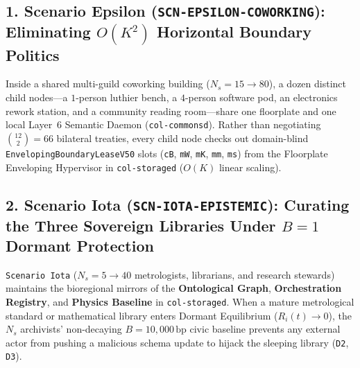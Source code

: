 \subsection{1. Scenario Epsilon (\texttt{SCN-EPSILON-COWORKING}): Eliminating $O(K^2)$ Horizontal Boundary Politics}
Inside a shared multi-guild coworking building ($N_s = 15 \to 80$), a dozen distinct child nodes---a $1$-person luthier bench, a $4$-person software pod, an electronics rework station, and a community reading room---share one floorplate and one local Layer~6 Semantic Daemon (\texttt{col-commonsd}). Rather than negotiating $\binom{12}{2} = 66$ bilateral treaties, every child node checks out domain-blind \texttt{EnvelopingBoundaryLeaseV50} slots (\texttt{cB}, \texttt{mW}, \texttt{mK}, \texttt{mm}, \texttt{ms}) from the Floorplate Enveloping Hypervisor in \texttt{col-storaged} ($O(K)$ linear scaling).

\subsection{2. Scenario Iota (\texttt{SCN-IOTA-EPISTEMIC}): Curating the Three Sovereign Libraries Under $B=1$ Dormant Protection}
\texttt{Scenario Iota} ($N_s = 5 \to 40$ metrologists, librarians, and research stewards) maintains the bioregional mirrors of the \textbf{Ontological Graph}, \textbf{Orchestration Registry}, and \textbf{Physics Baseline} in \texttt{col-storaged}. When a mature metrological standard or mathematical library enters Dormant Equilibrium ($R_i(t) \to 0$), the $N_s$ archivists' non-decaying $B = 10{,}000\,\mathrm{bp}$ civic baseline prevents any external actor from pushing a malicious schema update to hijack the sleeping library (\texttt{D2}, \texttt{D3}).

